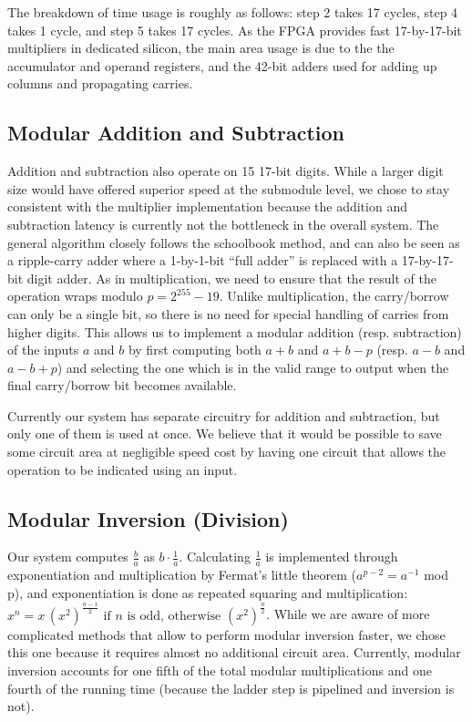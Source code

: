 The breakdown of time usage is roughly as follows: step 2 takes 17
cycles, step 4 takes 1 cycle, and step 5 takes 17 cycles. As the FPGA
provides fast 17-by-17-bit multipliers in dedicated silicon, the main
area usage is due to the the accumulator and operand registers, and the
42-bit adders used for adding up columns and propagating carries.

\subsection{Modular Addition and
Subtraction}\label{modular-addition-and-subtraction}

Addition and subtraction also operate on 15 17-bit digits. While a
larger digit size would have offered superior speed at the submodule
level, we chose to stay consistent with the multiplier implementation
because the addition and subtraction latency is currently not the
bottleneck in the overall system. The general algorithm closely follows
the schoolbook method, and can also be seen as a ripple-carry adder
where a 1-by-1-bit ``full adder'' is replaced with a 17-by-17-bit digit
adder. As in multiplication, we need to ensure that the result of the
operation wraps modulo \(p=2^{255}-19\). Unlike multiplication, the
carry/borrow can only be a single bit, so there is no need for special
handling of carries from higher digits. This allows us to implement a
modular addition (resp. subtraction) of the inputs \(a\) and \(b\) by
first computing both \(a+b\) and \(a+b-p\) (resp. \(a-b\) and \(a-b+p\))
and selecting the one which is in the valid range to output when the
final carry/borrow bit becomes available.

Currently our system has separate circuitry for addition and
subtraction, but only one of them is used at once. We believe that it
would be possible to save some circuit area at negligible speed cost by
having one circuit that allows the operation to be indicated using an
input.

\subsection{Modular Inversion
(Division)}\label{modular-inversion-division}

Our system computes \(\frac{b}{a}\) as \(b\cdot\frac{1}{a}\).
Calculating \(\frac{1}{a}\) is implemented through exponentiation and
multiplication by Fermat's little theorem (\(a^{p-2} = a^{-1}\) mod p),
and exponentiation is done as repeated squaring and multiplication:
\(x^n= x \, ( x^{2})^{\frac{n - 1}{2}} \mbox{ if } n \mbox{ is odd, otherwise } (x^{2})^{\frac{n}{2}}\).
While we are aware of more complicated methods that allow to perform
modular inversion faster, we chose this one because it requires almost
no additional circuit area. Currently, modular inversion accounts for
one fifth of the total modular multiplications and one fourth of the
running time (because the ladder step is pipelined and inversion is
not).


